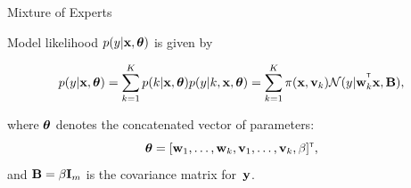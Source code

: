 \documentclass{beamer}
\newcommand\Wider[2][3em]{%
\makebox[\linewidth][c]{%
  \begin{minipage}{\dimexpr\textwidth+#1\relax}
  \raggedright#2
  \end{minipage}%
  }%
}
\newcommand{\argmax}{\mathop{\rm arg\,max}\limits}
\begin{document}
%
%
%
%
%
%
%
%
\begin{frame}{Mixture of Experts}

Model likelihood $p(y|{\mathbf{x}}, \boldsymbol{\theta})$ is given by

\[ p(y|{\mathbf{x}}, \boldsymbol{\theta}) = 
\sum_{k=1}^{K} p(k|{\mathbf{x}}, \boldsymbol{\theta})p(y|k, {\mathbf{x}}, \boldsymbol{\theta}) = 
\sum_{k=1}^{K} \pi({\mathbf{x}}, \mathbf{v}_k)\mathcal{N}(y|{\mathbf{w}}_k^{^{\text{\tiny\sffamily\upshape\mdseries T}}}{\mathbf{x}}, {\mathbf{B}}),
\]

\bigskip

where $\boldsymbol{\theta}$ denotes the concatenated vector of parameters:
\[
\boldsymbol{\theta} = [{\mathbf{w}}_1,\dots,{\mathbf{w}}_k,\mathbf{v}_1,\dots,\mathbf{v}_k,\beta]^{\text{\tiny\sffamily\upshape\mdseries T}},
\]
and ${\mathbf{B}} = \beta \mathbf{I}_m$ is the covariance matrix for~${\mathbf{y}}$.
%




\end{frame}
\end{document}
